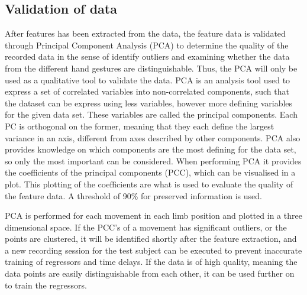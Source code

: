 \subsection{Validation of data}


After features has been extracted from the data, the feature data is validated through Principal Component Analysis (PCA) to determine the quality of the recorded data in the sense of identify outliers and examining whether the data from the different hand gestures are distinguishable. Thus, the PCA will only be used as a qualitative tool to validate the data. %
PCA is an analysis tool used to express a set of correlated variables into non-correlated components, such that the dataset can be express using less variables, however more defining variables for the given data set. These variables are called the principal components. Each PC is orthogonal on the former, meaning that they each define the largest variance in an axis, different from axes described by other components. PCA also provides knowledge on which components are the most defining for the data set, so only the most important can be considered. When performing PCA it provides the coefficients of the principal components (PCC), which can be visualised in a plot. This plotting of the coefficients are what is used to evaluate the quality of the feature data. A threshold of 90\% for preserved information is used. 

PCA is performed for each movement in each limb position and plotted in a three dimensional space. If the PCC's of a movement has significant outliers, or the points are clustered, it will be identified shortly after the feature extraction, and a new recording session for the test subject can be executed to prevent inaccurate training of regressors and time delays. If the data is of high quality, meaning the data points are easily distinguishable from each other, it can be used further on to train the regressors.

